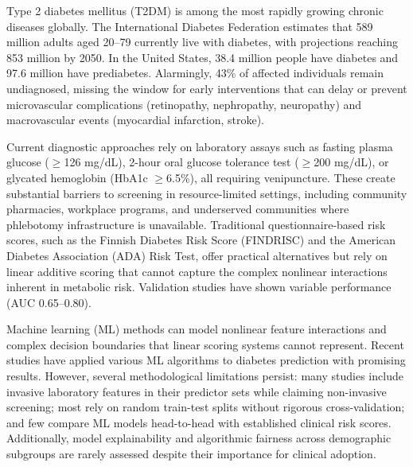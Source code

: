\documentclass{amia}
\begin{document}
Type 2 diabetes mellitus (T2DM) is among the most rapidly growing chronic diseases globally. The International Diabetes Federation estimates that 589 million adults aged 20--79 currently live with diabetes, with projections reaching 853 million by 2050.\cite{idf2025} In the United States, 38.4 million people have diabetes and 97.6 million have prediabetes.\cite{cdc2022} Alarmingly, 43\% of affected individuals remain undiagnosed,\cite{idf2025} missing the window for early interventions that can delay or prevent microvascular complications (retinopathy, nephropathy, neuropathy) and macrovascular events (myocardial infarction, stroke).\cite{tabak2012}

Current diagnostic approaches rely on laboratory assays such as fasting plasma glucose ($\geq$126 mg/dL), 2-hour oral glucose tolerance test ($\geq$200 mg/dL), or glycated hemoglobin (HbA1c $\geq$6.5\%), all requiring venipuncture.\cite{apa2024} These create substantial barriers to screening in resource-limited settings, including community pharmacies, workplace programs, and underserved communities where phlebotomy infrastructure is unavailable. Traditional questionnaire-based risk scores, such as the Finnish Diabetes Risk Score (FINDRISC)\cite{lindstrom2003} and the American Diabetes Association (ADA) Risk Test,\cite{bang2009} offer practical alternatives but rely on linear additive scoring that cannot capture the complex nonlinear interactions inherent in metabolic risk. Validation studies have shown variable performance (AUC 0.65--0.80).\cite{makrilakis2011,kengne2014}

Machine learning (ML) methods can model nonlinear feature interactions and complex decision boundaries that linear scoring systems cannot represent. Recent studies have applied various ML algorithms to diabetes prediction with promising results.\cite{zou2018,kopitar2020,deberneh2021,zhang2020,chan2023} However, several methodological limitations persist: many studies include invasive laboratory features in their predictor sets while claiming non-invasive screening;\cite{agliata2024,lee2021nhanes} most rely on random train-test splits without rigorous cross-validation; and few compare ML models head-to-head with established clinical risk scores. Additionally, model explainability and algorithmic fairness across demographic subgroups are rarely assessed despite their importance for clinical adoption.\cite{rudin2019,obermeyer2019}
\end{document}
